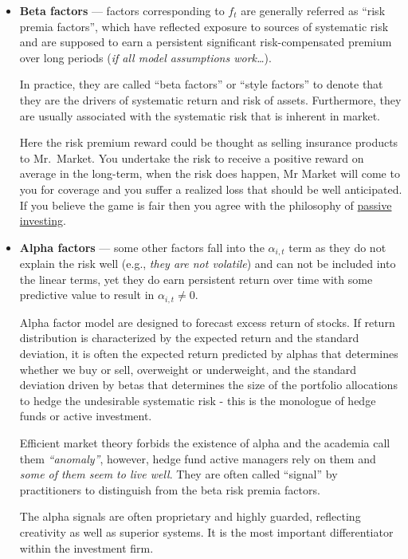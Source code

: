 \documentclass[
]{book}
\begin{document}
\begin{itemize}
\item
  {\textbf{Beta factors}} --- factors corresponding to \(f_t\) are generally referred as ``risk premia factors'', which have reflected exposure to sources of systematic risk and are supposed to earn a persistent significant risk-compensated premium over long periods ({\emph{if all model assumptions work\ldots{}}}).

  In practice, they are called ``beta factors'' or ``style factors'' to denote that they are the drivers of systematic return and risk of assets. Furthermore, they are usually associated with the systematic risk that is inherent in market.

  Here the risk premium reward could be thought as selling insurance products to Mr.~Market. You undertake the risk to receive a positive reward on average in the long-term, when the risk does happen, Mr Market will come to you for coverage and you suffer a realized loss that should be well anticipated. If you believe the game is fair then you agree with the philosophy of \href{https://www.investopedia.com/terms/p/passiveinvesting.asp}{passive investing}.
\item
  {\textbf{Alpha factors}} --- some other factors fall into the \(\alpha_{i,t}\) term as they do not explain the risk well (e.g., {\emph{they are not volatile}}) and can not be included into the linear terms, yet they do earn persistent return over time with some predictive value to result in \(\alpha_{i,t} \neq 0\).

  Alpha factor model are designed to forecast excess return of stocks. If return distribution is characterized by the expected return and the standard deviation, it is often the expected return predicted by alphas that determines whether we buy or sell, overweight or underweight, and the standard deviation driven by betas that determines the size of the portfolio allocations to hedge the undesirable systematic risk - this is the monologue of hedge funds or active investment.

  Efficient market theory forbids the existence of alpha and the academia call them {\emph{``anomaly''}}, however, hedge fund active managers rely on them and {\emph{some of them seem to live well}}. They are often called ``signal'' by practitioners to distinguish from the beta risk premia factors.

  The alpha signals are often proprietary and highly guarded, reflecting creativity as well as superior systems. It is the most important differentiator within the investment firm.
\end{itemize}
\end{document}
